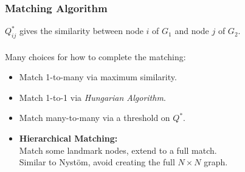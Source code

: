 \documentclass{beamer}
\begin{document}
\begin{frame}
  \frametitle{Matching Algorithm}
  $Q^*_{ij}$ gives the similarity between node $i$ of $G_1$ and node $j$ of $G_2$. \\~\\
  Many choices for how to complete the matching:
  \begin{itemize}
  \item Match 1-to-many via maximum similarity.
  \item Match 1-to-1 via \emph{Hungarian Algorithm}.
  \item Match many-to-many via a threshold on $Q^*$.
  \item \textbf{Hierarchical Matching:}\\
    Match some landmark nodes, extend to a full match.\\
    Similar to Nyst\"{o}m, avoid creating the full $N\times N$ graph.
  \end{itemize}
\end{frame}


\end{document}
